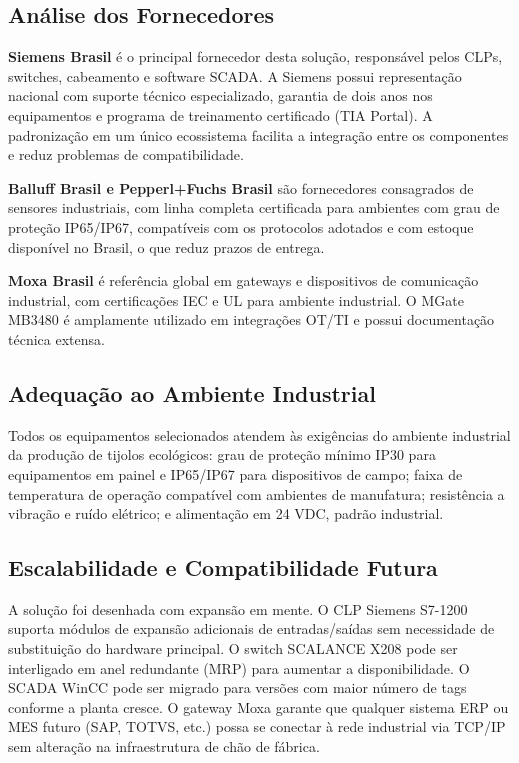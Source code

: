 \documentclass[12pt,a4paper]{article}
\begin{document}
\vspace{8pt}

\subsection{Análise dos Fornecedores}

\textbf{Siemens Brasil} é o principal fornecedor desta solução, responsável pelos CLPs,
switches, cabeamento e software SCADA. A Siemens possui representação nacional com
suporte técnico especializado, garantia de dois anos nos equipamentos e programa de
treinamento certificado (TIA Portal). A padronização em um único ecossistema facilita
a integração entre os componentes e reduz problemas de compatibilidade.

\textbf{Balluff Brasil e Pepperl+Fuchs Brasil} são fornecedores consagrados de sensores
industriais, com linha completa certificada para ambientes com grau de proteção IP65/IP67,
compatíveis com os protocolos adotados e com estoque disponível no Brasil, o que reduz
prazos de entrega.

\textbf{Moxa Brasil} é referência global em gateways e dispositivos de comunicação
industrial, com certificações IEC e UL para ambiente industrial. O MGate MB3480 é
amplamente utilizado em integrações OT/TI e possui documentação técnica extensa.

\subsection{Adequação ao Ambiente Industrial}

Todos os equipamentos selecionados atendem às exigências do ambiente industrial da
produção de tijolos ecológicos: grau de proteção mínimo IP30 para equipamentos em
painel e IP65/IP67 para dispositivos de campo; faixa de temperatura de operação
compatível com ambientes de manufatura; resistência a vibração e ruído elétrico;
e alimentação em 24 VDC, padrão industrial.

\subsection{Escalabilidade e Compatibilidade Futura}

A solução foi desenhada com expansão em mente. O CLP Siemens S7-1200 suporta módulos
de expansão adicionais de entradas/saídas sem necessidade de substituição do hardware
principal. O switch SCALANCE X208 pode ser interligado em anel redundante (MRP) para
aumentar a disponibilidade. O SCADA WinCC pode ser migrado para versões com maior
número de tags conforme a planta cresce. O gateway Moxa garante que qualquer sistema
ERP ou MES futuro (SAP, TOTVS, etc.) possa se conectar à rede industrial via TCP/IP
sem alteração na infraestrutura de chão de fábrica.
\end{document}
